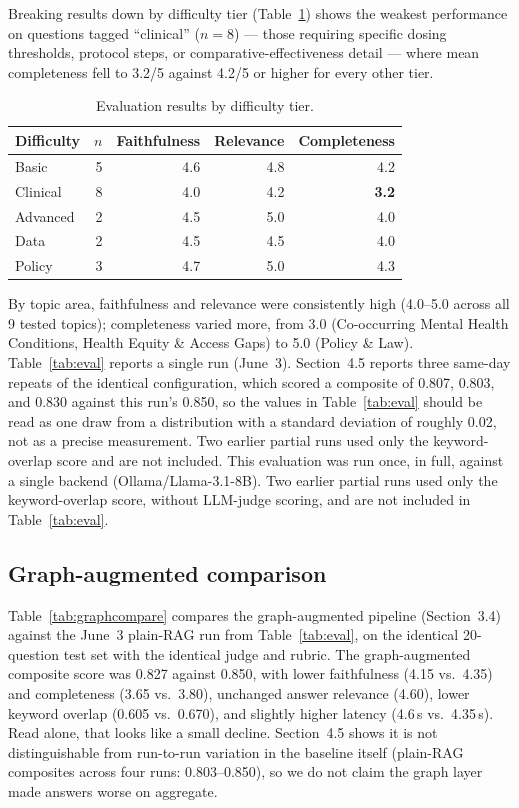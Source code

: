 \documentclass[11pt]{article}
\begin{document}
Breaking results down by difficulty tier (Table~\ref{tab:difficulty}) shows the weakest performance on questions tagged ``clinical'' ($n=8$) --- those requiring specific dosing thresholds, protocol steps, or comparative-effectiveness detail --- where mean completeness fell to 3.2/5 against 4.2/5 or higher for every other tier.

\begin{table}[h]
\centering
\caption{Evaluation results by difficulty tier.}
\label{tab:difficulty}
\begin{tabular}{lrrrr}
\toprule
Difficulty & $n$ & Faithfulness & Relevance & Completeness \\
\midrule
Basic & 5 & 4.6 & 4.8 & 4.2 \\
Clinical & 8 & 4.0 & 4.2 & \textbf{3.2} \\
Advanced & 2 & 4.5 & 5.0 & 4.0 \\
Data & 2 & 4.5 & 4.5 & 4.0 \\
Policy & 3 & 4.7 & 5.0 & 4.3 \\
\bottomrule
\end{tabular}
\end{table}

By topic area, faithfulness and relevance were consistently high (4.0--5.0 across all 9 tested topics); completeness varied more, from 3.0 (Co-occurring Mental Health Conditions, Health Equity \& Access Gaps) to 5.0 (Policy \& Law).
Table~\ref{tab:eval} reports a single run (June~3). Section~4.5 reports three same-day repeats of the identical configuration, which scored a composite of 0.807, 0.803, and 0.830 against this run's 0.850, so the values in Table~\ref{tab:eval} should be read as one draw from a distribution with a standard deviation of roughly 0.02, not as a precise measurement. Two earlier partial runs used only the keyword-overlap score and are not included.
This evaluation was run once, in full, against a single backend (Ollama/Llama-3.1-8B). Two earlier partial runs used only the keyword-overlap score, without LLM-judge scoring, and are not included in Table~\ref{tab:eval}.

\subsection{Graph-augmented comparison}

Table~\ref{tab:graphcompare} compares the graph-augmented pipeline (Section~3.4) against the June~3 plain-RAG run from Table~\ref{tab:eval}, on the identical 20-question test set with the identical judge and rubric. The graph-augmented composite score was 0.827 against 0.850, with lower faithfulness (4.15 vs.\ 4.35) and completeness (3.65 vs.\ 3.80), unchanged answer relevance (4.60), lower keyword overlap (0.605 vs.\ 0.670), and slightly higher latency (4.6\,s vs.\ 4.35\,s). Read alone, that looks like a small decline. Section~4.5 shows it is not distinguishable from run-to-run variation in the baseline itself (plain-RAG composites across four runs: 0.803--0.850), so we do not claim the graph layer made answers worse on aggregate.
\end{document}
